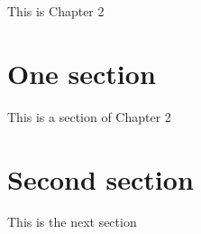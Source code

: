 This is Chapter 2

\section{One section}

This is a section of Chapter 2

\section{Second section}

This is the next section


